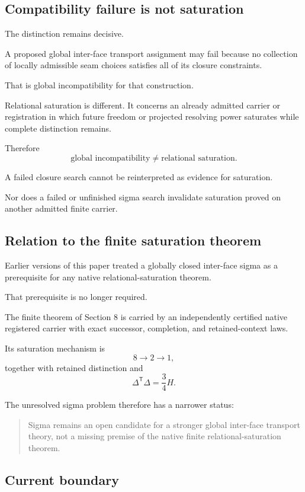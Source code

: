 \subsection{Compatibility failure is not saturation}

The distinction remains decisive.

A proposed global inter-face transport assignment may fail because no
collection of locally admissible seam choices satisfies all of its
closure constraints.

That is global incompatibility for that construction.

Relational saturation is different.  It concerns an already admitted
carrier or registration in which future freedom or projected
resolving power saturates while complete distinction remains.

Therefore
\[
\text{global incompatibility}
\neq
\text{relational saturation}.
\]

A failed closure search cannot be reinterpreted as evidence for
saturation.

Nor does a failed or unfinished sigma search invalidate saturation
proved on another admitted finite carrier.

\subsection{Relation to the finite saturation theorem}

Earlier versions of this paper treated a globally closed inter-face
sigma as a prerequisite for any native relational-saturation theorem.

That prerequisite is no longer required.

The finite theorem of Section 8 is carried by an independently
certified native registered carrier with exact successor,
completion, and retained-context laws.

Its saturation mechanism is
\[
8\longrightarrow2\longrightarrow1,
\]
together with retained distinction and
\[
\Delta^{\mathsf T}\Delta=\frac34H.
\]

The unresolved sigma problem therefore has a narrower status:

\begin{quote}
Sigma remains an open candidate for a stronger global inter-face
transport theory, not a missing premise of the native finite
relational-saturation theorem.
\end{quote}

\subsection{Current boundary}

